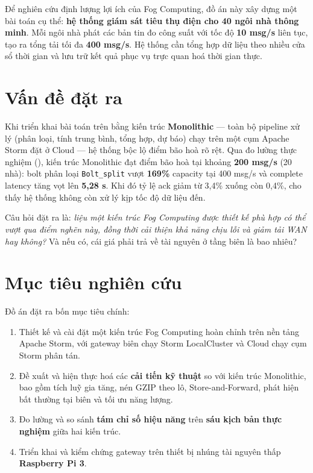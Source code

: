 \documentclass[13pt,a4paper]{report}
\newcommand{\code}[1]{\texttt{\small #1}}
\begin{document}
Để nghiên cứu định lượng lợi ích của Fog Computing, đồ án này xây dựng một bài
toán cụ thể: \textbf{hệ thống giám sát tiêu thụ điện cho 40 ngôi nhà thông
minh}. Mỗi ngôi nhà phát các bản tin đo công suất với tốc độ \textbf{10 msg/s}
liên tục, tạo ra tổng tải tối đa \textbf{400 msg/s}. Hệ thống cần tổng hợp dữ
liệu theo nhiều cửa sổ thời gian và lưu trữ kết quả phục vụ trực quan hoá thời
gian thực.

\section{Vấn đề đặt ra}

Khi triển khai bài toán trên bằng kiến trúc \textbf{Monolithic} --- toàn bộ
pipeline xử lý (phân loại, tính trung bình, tổng hợp, dự báo) chạy trên một
cụm Apache Storm đặt ở Cloud --- hệ thống bộc lộ điểm bão hoà rõ rệt. Qua đo
lường thực nghiệm (), kiến trúc Monolithic đạt điểm bão hoà
tại khoảng \textbf{200 msg/s} (20 nhà): bolt phân loại \code{Bolt\_split} vượt
\textbf{169\%} capacity tại 400 msg/s và complete latency tăng vọt lên
\textbf{5,28 s}. Khi đó tỷ lệ ack giảm từ 3,4\% xuống còn 0,4\%, cho thấy hệ
thống không còn xử lý kịp tốc độ dữ liệu đến.

Câu hỏi đặt ra là: \textit{liệu một kiến trúc Fog Computing được thiết kế phù hợp
có thể vượt qua điểm nghẽn này, đồng thời cải thiện khả năng chịu lỗi và giảm tải
WAN hay không?} Và nếu có, cái giá phải trả về tài nguyên ở tầng biên là bao
nhiêu?

\section{Mục tiêu nghiên cứu}

Đồ án đặt ra bốn mục tiêu chính:

\begin{enumerate}
  \item Thiết kế và cài đặt một kiến trúc Fog Computing hoàn chỉnh trên nền tảng
        Apache Storm, với gateway biên chạy Storm LocalCluster và Cloud chạy cụm
        Storm phân tán.
  \item Đề xuất và hiện thực hoá các \textbf{cải tiến kỹ thuật} so với kiến trúc
        Monolithic, bao gồm tích luỹ gia tăng, nén GZIP theo lô, Store-and-Forward,
        phát hiện bất thường tại biên và tối ưu năng lượng.
  \item Đo lường và so sánh \textbf{tám chỉ số hiệu năng} trên \textbf{sáu kịch
        bản thực nghiệm} giữa hai kiến trúc.
  \item Triển khai và kiểm chứng gateway trên thiết bị nhúng tài nguyên thấp
        \textbf{Raspberry Pi 3}.
\end{enumerate}
\end{document}
